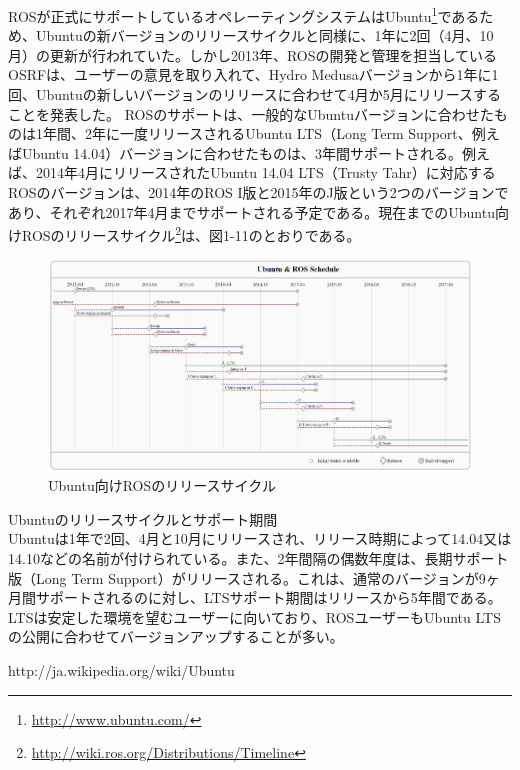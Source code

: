 {{ROSが正式にサポートしているオペレーティングシステムはUbuntu\footnote{\url{http://www.ubuntu.com/}}であるため、Ubuntuの新バージョンのリリースサイクルと同様に、1年に2回（4月、10月）の更新が行われていた。しかし2013年、ROSの開発と管理を担当しているOSRFは、ユーザーの意見を取り入れて、Hydro Medusaバージョンから1年に1回、Ubuntuの新しいバージョンのリリースに合わせて4月か5月にリリースすることを発表した。
ROSのサポートは、一般的なUbuntuバージョンに合わせたものは1年間、2年に一度リリースされるUbuntu LTS（Long Term Support、例えばUbuntu 14.04）バージョンに合わせたものは、3年間サポートされる。例えば、2014年4月にリリースされたUbuntu 14.04 LTS（Trusty Tahr）に対応するROSのバージョンは、2014年のROS I版と2015年のJ版という2つのバージョンであり、それぞれ2017年4月までサポートされる予定である。現在までのUbuntu向けROSのリリースサイクル\footnote{\url{http://wiki.ros.org/Distributions/Timeline}}は、図1-11のとおりである。\\

\begin{figure}[h]
  \centering
  \includegraphics[width=\columnwidth]{pictures/chapter1/pic_01_07.png}
  \caption{Ubuntu向けROSのリリースサイクル}
\end{figure}

\newline
Ubuntuのリリースサイクルとサポート期間\\

Ubuntuは1年で2回、4月と10月にリリースされ、リリース時期によって14.04又は14.10などの名前が付けられている。また、2年間隔の偶数年度は、長期サポート版（Long Term Support）がリリースされる。これは、通常のバージョンが9ヶ月間サポートされるのに対し、LTSサポート期間はリリースから5年間である。LTSは安定した環境を望むユーザーに向いており、ROSユーザーもUbuntu LTSの公開に合わせてバージョンアップすることが多い。

http://ja.wikipedia.org/wiki/Ubuntu

}}
